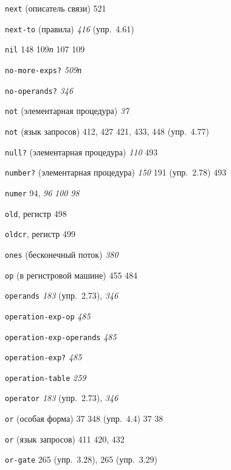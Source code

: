 \begin{theindex}
\item {\texttt{next} (описатель связи)} 521
\item {\texttt{next-to} (правила)} {\it 416} (упр.~4.61)
\item {\texttt{nil}}
   148
   109{\it п}
   107
   109
\item {\texttt{no-more-exps?}} {\it 509}{\it п}
\item {\texttt{no-operands?}} {\it 346}
\item {\texttt{not} (элементарная процедура)} {\it 37}
\item {\texttt{not} (язык запросов)} 412, 427
   421, 433, 448 (упр.~4.77)
\item {\texttt{null?} (элементарная процедура)} {\it 110}
   493
\item {\texttt{number?} (элементарная процедура)} {\it 150}
   191 (упр.~2.78)
   493
\item {\texttt{numer}} 94, {\it 96}
   {\it 100}
   {\it 98}
\bigskip
\item {\texttt{old}, регистр} 498
\item {\texttt{oldcr}, регистр} 499
\item {\texttt{ones} (бесконечный поток)}
   {\it 380}
\item {\texttt{op} (в регистровой машине)} 455
   484
\item {\texttt{operands}} {\it 183} (упр.~2.73), {\it 346}
\item {\texttt{operation-exp-op}} {\it 485}
\item {\texttt{operation-exp-operands}} {\it 485}
\item {\texttt{operation-exp?}} {\it 485}
\item {\texttt{operation-table}} {\it 259}
\item {\texttt{operator}} {\it 183} (упр.~2.73), {\it 346}
\item {\texttt{or} (особая форма)} 37
   348 (упр.~4.4)
   37
   38
\item {\texttt{or} (язык запросов)} 411
   420, 432
\item {\texttt{or-gate}} 265 (упр.~3.28), 265 (упр.~3.29)

\end{theindex}
